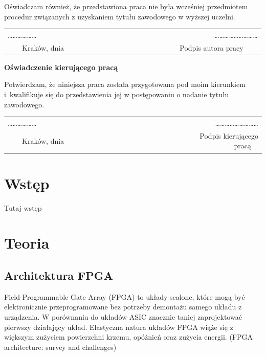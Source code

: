 \documentclass[12pt, oneside, a4paper]{article}
\begin{document}
\noindent Oświadczam również, że przedstawiona praca nie była wcześniej przedmiotem procedur związanych z uzyskaniem tytułu zawodowego w wyższej uczelni.
\vspace{2cm}
\begin{center}
\begin{tabular}{lr}
\ldots\ldots\ldots\ldots\ldots\ldots~~~~~~~~~~~~~~~~~~~~~~~~~~~~~~~~~~~~~~&
\ldots\ldots\ldots\ldots\ldots\ldots\ldots\ldots\ldots \\
{~~~~Kraków, dnia} & {Podpis autora pracy~~~~}
\end{tabular}
\end{center}
\vspace{5cm}
\begin{flushleft}
\large \textbf{Oświadczenie kierującego pracą}
\end{flushleft}

\noindent Potwierdzam, że niniejsza praca została przygotowana pod moim kierunkiem i~kwalifikuje się do przedstawienia jej w postępowaniu o nadanie tytułu zawodowego.
\vspace{2cm}
\begin{center}
\begin{tabular}{lr}
\ldots\ldots\ldots\ldots\ldots\ldots~~~~~~~~~~~~~~~~~~~~~~~~~~~~~~~~~~~~~~&
\ldots\ldots\ldots\ldots\ldots\ldots\ldots\ldots\ldots \\
{~~~~Kraków, dnia} & {Podpis kierującego pracą~~}
\end{tabular}
\end{center}
\vfill

\newpage
\tableofcontents

\newpage
\section{Wstęp}
Tutaj wstęp

\newpage
\section{Teoria}
\subsection{Architektura FPGA}
Field-Programmable Gate Array (FPGA) to układy scalone, które mogą być
elektronicznie przeprogramowane bez potrzeby demontażu samego układu
z urządzenia. W porównaniu do układów ASIC znacznie taniej zaprojektować
pierwszy działający układ. Elastyczna natura układów FPGA wiąże się z większym
zużyciem powierzchni krzemu, opóźnień oraz zużycia energii.
 (FPGA architecture: survey and challenges)
\end{document}
